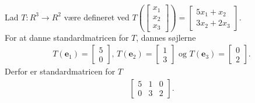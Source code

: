 \begin{eks}\label{entydigeks}
%
Lad $T: R^3 \rightarrow R^2$ være defineret ved $T\left(
\begin{bmatrix}
x_1\\
x_2\\
x_3
\end{bmatrix}
\right)
=
\begin{bmatrix}%
5x_1+x_2\\
3x_2+2x_3
\end{bmatrix}
$. \\
For at danne standardmatricen for $T$, dannes søjlerne 
\begin{align*}
T(\mathbf{e}_1)=
\begin{bmatrix}
5\\
0
\end{bmatrix}\text{, }
T(\mathbf{e}_2)=
\begin{bmatrix}
1\\
3
\end{bmatrix}\text{ og }
T(\mathbf{e}_3)=
\begin{bmatrix}
0\\
2
\end{bmatrix}.
\end{align*}
Derfor er standardmatricen for $T$
\begin{align*}
\begin{bmatrix}
5 & 1 & 0\\
0 & 3 & 2
\end{bmatrix}.
\end{align*}
\end{eks}